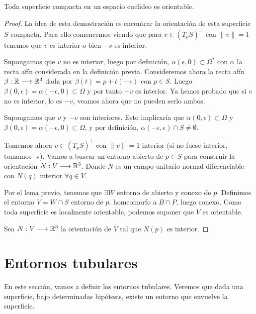 \begin{theorem}
Toda superficie compacta en un espacio euclideo es orientable.
\end{theorem}
\begin{proof}
La idea de esta demostración es encontrar la orientación de esta superficie $S$ compacta. Para ello comencemos viendo que para $v \in (T_pS)^{\bot}$ con $\parallel v \parallel=1$ tenemos que $v$ es interior o bien $-v$ es interior.

Supongamos que $v$ no es interior, luego por definición, $\alpha(\epsilon, 0) \subset \Omega^{*}$ con $\alpha$ la recta afín considerada en la definición previa. Consideremos ahora la recta afín $\beta: \mathbb{R} \longrightarrow \mathbb{R}^3$ dada por $\beta(t)=p + t(-v)$ con $p \in S$. Luego $\beta(0, \epsilon) = \alpha(-\epsilon, 0) \subset \Omega$ y por tanto $-v$ es interior. Ya hemos probado que si $v$ no es interior, lo es $-v$, veamos ahora que no pueden serlo ambos. 

Supongamos que $v$ y $-v$ son interiores. Esto implicaría que $\alpha(0,\epsilon) \subset \Omega$ y $\beta(0, \epsilon) = \alpha(-\epsilon, 0) \subset \Omega$, y por definición, $\alpha(-\epsilon, \epsilon) \cap S \neq \emptyset$.

Tomemos ahora $v \in (T_pS)^{\bot}$ con $\parallel v \parallel=1$ interior (si no fuese interior, tomamos -v). Vamos a buscar un entorno abierto de $p \in S$ para construir la orientación $N: V \longrightarrow \mathbb{R}^3$. Donde $N$ es un campo unitario normal diferenciable con $N(q)$ interior $\forall q \in V.$

Por el lema previo, tenemos que $\exists W$ entorno de abierto y conexo de $p$. Definimos el entorno $V=W\cap S$ entorno de $p$, homeomorfo a $B\cap P$, luego conexo. Como toda superficie es localmente orientable, podemos suponer que $V$ es orientable.

Sea $N: V \longrightarrow \mathbb{R}^3$ la orientación de $V$ tal que $N(p)$ es interior.


\end{proof}

\section{Entornos tubulares}

En este sección, vamos a definir los entornos tubulares. Veremos que dada una superficie, bajo determinadas hipótesis, existe un entorno que envuelve la superficie.

